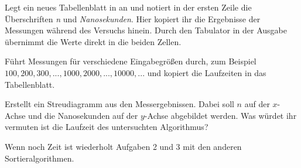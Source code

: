\documentclass[10pt, a4paper]{scrartcl}
\begin{document}
\begin{aufgabe}
	Legt ein neues Tabellenblatt in  an und notiert in der ersten Zeile die Überschriften \emph{n} und \emph{Nanosekunden}. Hier kopiert ihr die Ergebnisse der Messungen während des Versuchs hinein. Durch den Tabulator in der Ausgabe übernimmt  die Werte direkt in die beiden Zellen.
	
	Führt Messungen für verschiedene Eingabegrößen durch, zum Beispiel $100, 200, 300, ..., 1000, 2000, ..., 10000, ...$ und kopiert die Laufzeiten in das Tabellenblatt.
\end{aufgabe}

\begin{aufgabe}
	Erstellt ein Streudiagramm aus den Messergebnissen. Dabei soll $n$ auf der $x$-Achse und die Nanosekunden auf der $y$-Achse abgebildet werden. Was würdet ihr vermuten ist die Laufzeit des untersuchten Algorithmus?
\end{aufgabe}

\bigskip
Wenn noch Zeit ist wiederholt Aufgaben 2 und 3 mit den anderen Sortieralgorithmen.
\end{document}
